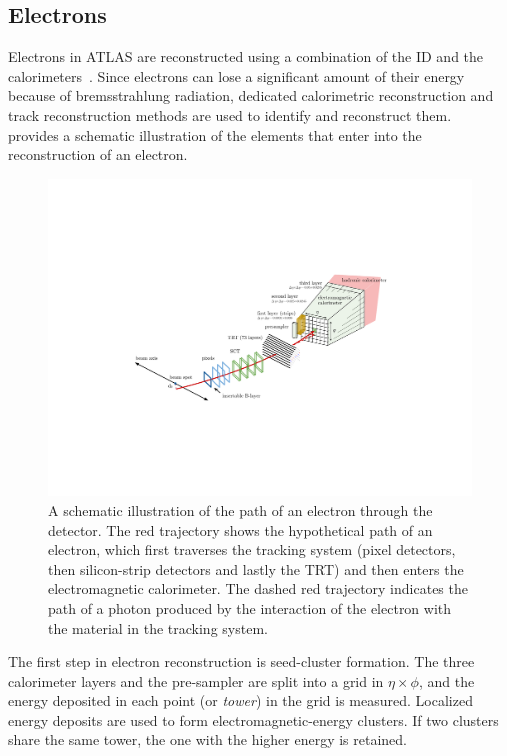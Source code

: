 \subsection{Electrons}
Electrons in ATLAS are reconstructed using a combination of the ID and the calorimeters~\cite{PERF-2017-01}. Since electrons can lose a significant amount of their energy because of bremsstrahlung radiation, dedicated calorimetric reconstruction and track reconstruction methods are used to identify and reconstruct them.~ provides a schematic illustration of the elements that enter into the reconstruction of an electron.


\begin{figure}[!ht]
    \centering
    \includegraphics[width=0.8\linewidth]{figures//experiment/electronReco.pdf}
    \caption{A schematic illustration of the path of an electron through the detector. The red trajectory shows the hypothetical path of an electron, which first traverses the tracking system (pixel detectors, then silicon-strip detectors and lastly the TRT) and then enters the electromagnetic calorimeter. The dashed red trajectory indicates the path of a photon produced by the interaction of the electron with the material in the tracking system.~\cite{PERF-2017-01}}
    \label{fig:el-reco}
\end{figure}

The first step in electron reconstruction is seed-cluster formation. The three calorimeter layers and the pre-sampler are split into a grid in $\eta\times\phi$, and the energy deposited in each point (or \textit{tower}) in the grid is measured. Localized energy deposits are used to form electromagnetic-energy clusters. If two clusters share the same tower, the one with the higher energy is retained.

